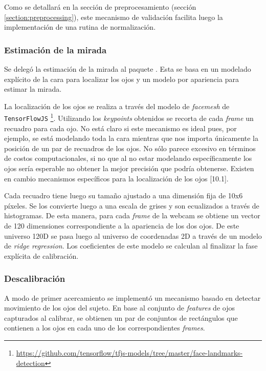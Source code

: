 Como se detallará en la sección de preprocesamiento (sección
\ref{section:preprocessing}), este mecanismo de validación facilita luego la
implementación de una rutina de normalización.

\subsubsection{Estimación de la mirada}

Se delegó la estimación de la mirada al paquete \webgazer
\cite{papoutsaki_2016_webgazer}.
Esta se basa en un modelado explícito de la cara para localizar los ojos y un
modelo por apariencia para estimar la mirada.

La localización de los ojos se realiza a través del modelo de \textit{facemesh}
de \texttt{TensorFlowJS}
\footnote{\url{https://github.com/tensorflow/tfjs-models/tree/master/face-landmarks-detection}}.
Utilizando los \textit{keypoints} obtenidos se recorta de cada \textit{frame}
un recuadro para cada ojo.
No está claro si este mecanismo es ideal pues, por ejemplo, se está modelando
toda la cara mientras que nos importa únicamente la posición de un par de
recuadros de los ojos.
No sólo parece excesivo en términos de costos computacionales, si no que al no
estar modelando específicamente los ojos sería esperable no obtener la mejor
precisión que podría obtenerse.
Existen en cambio mecanismos específicos para la localización de los ojos
[10.1].

Cada recuadro tiene luego su tamaño ajustado a una dimensión fija de 10x6
píxeles.
Se los convierte luego a una escala de grises y son ecualizados a través de
histogramas.
De esta manera, para cada \textit{frame} de la webcam se obtiene un vector de
120 dimensiones correspondiente a la apariencia de los dos ojos.
De este universo 120D se pasa luego al universo de coordenadas 2D a través de
un modelo de \textit{ridge regression}.
Los coeficientes de este modelo se calculan al finalizar la fase explícita de
calibración.

\subsubsection{Descalibración}

A modo de primer acercamiento se implementó un mecanismo basado en detectar
movimiento de los ojos del sujeto.
En base al conjunto de \textit{features} de ojos capturados al calibrar, se
obtienen un par de conjuntos de rectángulos que contienen a los ojos en cada
uno de los correspondientes \textit{frames}.

